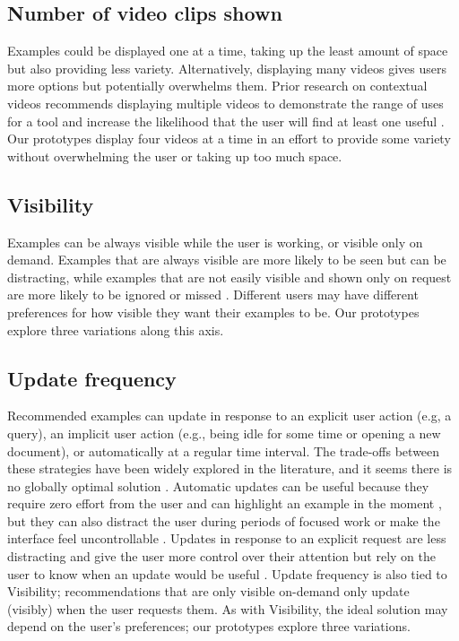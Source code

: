 \subsection{Number of video clips shown}
Examples could be displayed one at a time, taking up the least amount of space but also providing less variety. Alternatively, displaying many videos gives users more options but potentially overwhelms them. Prior research on contextual videos recommends displaying multiple videos to demonstrate the range of uses for a tool and increase the likelihood that the user will find at least one useful \cite{Lafreniere2014, Matejka2011}. Our prototypes display four videos at a time in an effort to provide some variety without overwhelming the user or taking up too much space.

\subsection{Visibility}
Examples can be always visible while the user is working, or visible only on demand. Examples that are always visible are more likely to be seen but can be distracting, while examples that are not easily visible and shown only on request are more likely to be ignored or missed \cite{Rhodes1996}. Different users may have different preferences for how visible they want their examples to be. Our prototypes explore three variations along this axis.

\subsection{Update frequency}
Recommended examples can update in response to an explicit user action (e.g, a query), an implicit user action (e.g., being idle for some time or opening a new document), or automatically at a regular time interval. The trade-offs between these strategies have been widely explored in the literature, and it seems there is no globally optimal solution \cite{Rhodes1996, Chan2017, Siangliulue2015}. Automatic updates can be useful because they require zero effort from the user and can highlight an example in the moment \cite{Rhodes1996}, but they can also distract the user during periods of focused work \cite{Chan2017} or make the interface feel uncontrollable \cite{ODonovan2015}. Updates in response to an explicit request are less distracting and give the user more control over their attention but rely on the user to know when an update would be useful \cite{Rhodes1996, Siangliulue2015}. Update frequency is also tied to Visibility; recommendations that are only visible on-demand only update (visibly) when the user requests them. As with Visibility, the ideal solution may depend on the user's preferences; our prototypes explore three variations.

